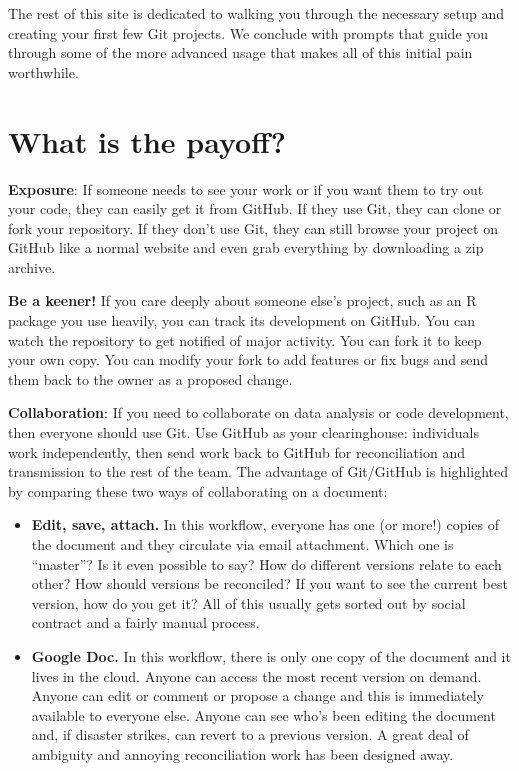 \documentclass[
]{book}
\providecommand{\tightlist}{%
  \setlength{\itemsep}{0pt}\setlength{\parskip}{0pt}}
\begin{document}
The rest of this site is dedicated to walking you through the necessary setup and creating your first few Git projects. We conclude with prompts that guide you through some of the more advanced usage that makes all of this initial pain worthwhile.

\section{What is the payoff?}\label{what-is-the-payoff}

\textbf{Exposure}: If someone needs to see your work or if you want them to try out your code, they can easily get it from GitHub. If they use Git, they can clone or fork your repository. If they don't use Git, they can still browse your project on GitHub like a normal website and even grab everything by downloading a zip archive.

\textbf{Be a keener!} If you care deeply about someone else's project, such as an R package you use heavily, you can track its development on GitHub. You can watch the repository to get notified of major activity. You can fork it to keep your own copy. You can modify your fork to add features or fix bugs and send them back to the owner as a proposed change.

\textbf{Collaboration}: If you need to collaborate on data analysis or code development, then everyone should use Git. Use GitHub as your clearinghouse: individuals work independently, then send work back to GitHub for reconciliation and transmission to the rest of the team. The advantage of Git/GitHub is highlighted by comparing these two ways of collaborating on a document:

\begin{itemize}
\tightlist
\item
  \textbf{Edit, save, attach.} In this workflow, everyone has one (or more!) copies of the document and they circulate via email attachment. Which one is ``master''? Is it even possible to say? How do different versions relate to each other? How should versions be reconciled? If you want to see the current best version, how do you get it? All of this usually gets sorted out by social contract and a fairly manual process.
\item
  \textbf{Google Doc.} In this workflow, there is only one copy of the document and it lives in the cloud. Anyone can access the most recent version on demand. Anyone can edit or comment or propose a change and this is immediately available to everyone else. Anyone can see who's been editing the document and, if disaster strikes, can revert to a previous version. A great deal of ambiguity and annoying reconciliation work has been designed away.
\end{itemize}
\end{document}
